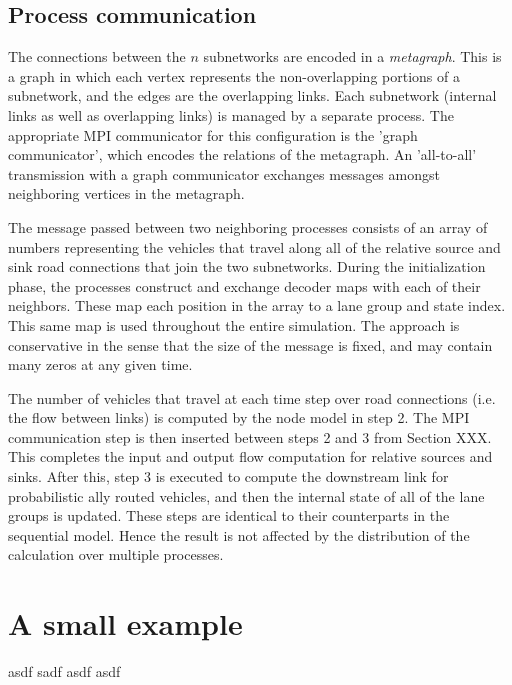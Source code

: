 \subsection{Process communication}

The connections between the $n$ subnetworks are encoded in a \textit{metagraph}. This is a graph in which each vertex represents the non-overlapping portions of a subnetwork, and the edges are the overlapping links. Each subnetwork (internal links as well as overlapping links) is managed by a separate process. The appropriate MPI communicator for this configuration is the 'graph communicator', which encodes the relations of the metagraph. An 'all-to-all' transmission with a graph communicator exchanges messages amongst neighboring vertices in the metagraph. 

The message passed between two neighboring processes consists of an array of numbers representing the vehicles that travel along all of the relative source and sink road connections that join the two subnetworks. During the initialization phase, the processes construct and exchange decoder maps with each of their neighbors. These map each position in the array to a lane group and state index. This same map is used throughout the entire simulation. The approach is conservative in the sense that the size of the message is fixed, and may contain many zeros at any given time. 

The number of vehicles that travel at each time step over road connections (i.e. the flow between links) is computed by the node model in step 2. The MPI communication step is then inserted between steps 2 and 3 from Section XXX. This completes the input and output flow computation for relative sources and sinks. After this, step 3 is executed to compute the downstream link for probabilistic ally routed vehicles, and then the internal state of all of the lane groups is updated. These steps are identical to their counterparts in the sequential model. Hence the result is not affected by the distribution of the calculation over multiple processes.

\section{A small example}
asdf sadf asdf asdf 


